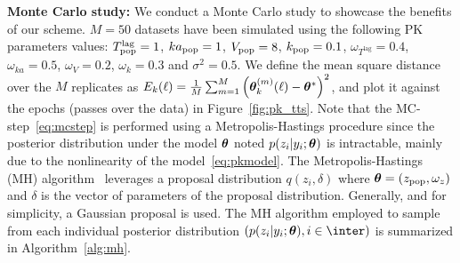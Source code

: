 \documentclass[bj]{imsart}
\numberwithin{equation}{section}
\theoremstyle{plain}
\begin{document}
\vspace{0.15in}
\noindent \textbf{Monte Carlo study:}
We conduct a Monte Carlo study to showcase the benefits of our scheme.
$M=50$ datasets have been simulated using the following PK parameters values:
$T^{\textrm{lag}}_{\rm pop} =1$, $ka_{\rm pop} =1$, $V_{\rm pop}= 8$, $k_{\rm pop}=0.1$, $ \omega_{T^{\textrm{lag}}}=0.4$, $\omega_{ka}=0.5$, $\omega_{V}=0.2$, $\omega_{k}=0.3$ and $\sigma^2=0.5$.
We define the mean square distance over the $M$ replicates as $E_k(\ell) = \frac{1}{M}\sum_{m=1}^{M}{\left(\param_k^{(m)}(\ell) - \param^* \right)^2} $, and plot it against the epochs (passes over the data) in Figure~\ref{fig:pk_tts}.	
Note that the { MC-step}~\eqref{eq:mcstep} is performed using a Metropolis-Hastings procedure since the posterior distribution under the model $\param$ noted $p(z_i | y_i; \param)$ is intractable, mainly due to the nonlinearity of the model~\eqref{eq:pkmodel}.
The Metropolis-Hastings (MH) algorithm~\citep{meyn2012markov} leverages a proposal distribution $q(z_{i}, \delta)$ where $\param = (z_{\rm pop}, \omega_{z})$ and $ \delta$ is the vector of parameters of the proposal distribution. Generally, and for simplicity, a Gaussian proposal is used. 
The MH algorithm employed to sample from each individual posterior distribution $\left(p(z_i | y_i; \param), i\in \inter \right)$ is summarized in Algorithm~\ref{alg:mh}.
\end{document}
